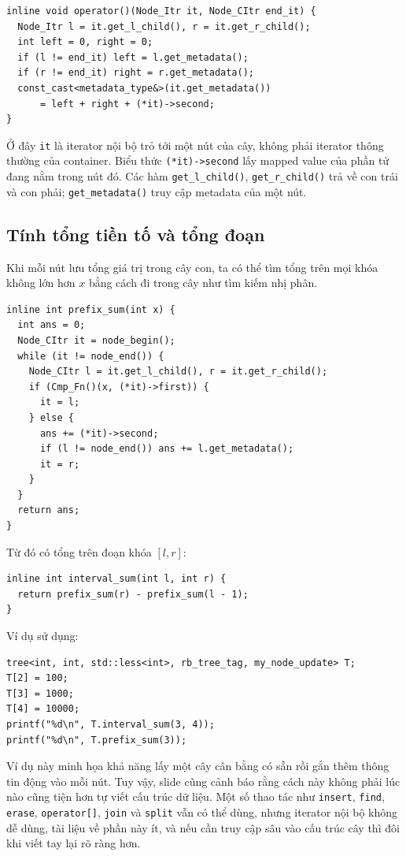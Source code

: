 \documentclass[11pt]{article}
\begin{document}
\begingroup
\small
\begin{verbatim}
inline void operator()(Node_Itr it, Node_CItr end_it) {
  Node_Itr l = it.get_l_child(), r = it.get_r_child();
  int left = 0, right = 0;
  if (l != end_it) left = l.get_metadata();
  if (r != end_it) right = r.get_metadata();
  const_cast<metadata_type&>(it.get_metadata())
      = left + right + (*it)->second;
}
\end{verbatim}
\endgroup

Ở đây \texttt{it} là iterator nội bộ trỏ tới một nút của cây, không phải
iterator thông thường của container. Biểu thức \texttt{(*it)->second} lấy
mapped value của phần tử đang nằm trong nút đó. Các hàm
\texttt{get\_l\_child()}, \texttt{get\_r\_child()} trả về con trái và con
phải; \texttt{get\_metadata()} truy cập metadata của một nút.

\subsection{Tính tổng tiền tố và tổng đoạn}

Khi mỗi nút lưu tổng giá trị trong cây con, ta có thể tìm tổng trên mọi khóa
không lớn hơn $x$ bằng cách đi trong cây như tìm kiếm nhị phân.

\begingroup
\small
\begin{verbatim}
inline int prefix_sum(int x) {
  int ans = 0;
  Node_CItr it = node_begin();
  while (it != node_end()) {
    Node_CItr l = it.get_l_child(), r = it.get_r_child();
    if (Cmp_Fn()(x, (*it)->first)) {
      it = l;
    } else {
      ans += (*it)->second;
      if (l != node_end()) ans += l.get_metadata();
      it = r;
    }
  }
  return ans;
}
\end{verbatim}
\endgroup

Từ đó có tổng trên đoạn khóa $[l,r]$:

\begingroup
\small
\begin{verbatim}
inline int interval_sum(int l, int r) {
  return prefix_sum(r) - prefix_sum(l - 1);
}
\end{verbatim}
\endgroup

Ví dụ sử dụng:

\begingroup
\small
\begin{verbatim}
tree<int, int, std::less<int>, rb_tree_tag, my_node_update> T;
T[2] = 100;
T[3] = 1000;
T[4] = 10000;
printf("%d\n", T.interval_sum(3, 4));
printf("%d\n", T.prefix_sum(3));
\end{verbatim}
\endgroup

Ví dụ này minh họa khả năng lấy một cây cân bằng có sẵn rồi gắn thêm thông tin
động vào mỗi nút. Tuy vậy, slide cũng cảnh báo rằng cách này không phải lúc
nào cũng tiện hơn tự viết cấu trúc dữ liệu. Một số thao tác như
\texttt{insert}, \texttt{find}, \texttt{erase}, \texttt{operator[]},
\texttt{join} và \texttt{split} vẫn có thể dùng, nhưng iterator nội bộ không
dễ dùng, tài liệu về phần này ít, và nếu cần truy cập sâu vào cấu trúc cây thì
đôi khi viết tay lại rõ ràng hơn.
\end{document}
